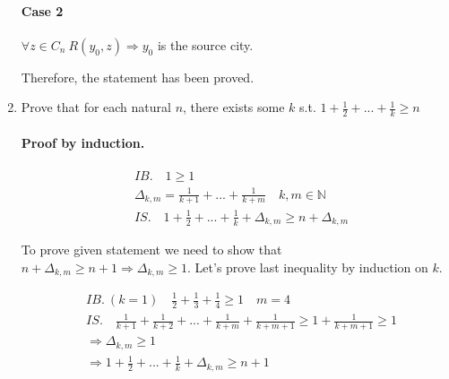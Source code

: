 \documentclass{article}
\begin{document}
\begin{enumerate}
\paragraph{Case 2}
$\forall z \in C_n \: R(y_0, z) \Rightarrow y_0 $ is the source city.

Therefore, the statement has been proved.

\item Prove that for each natural $n$, there exists some $k$ s.t. $1 + \frac{1}{2} + ... + \frac{1}{k} \geq n$

\paragraph{Proof by induction.}
\begin{align*}
&IB. \quad 1 \geq 1\\
&\Delta_{k,m} = \frac{1}{k+1} + ... + \frac{1}{k+m} \quad k, m \in \mathbb{N}\\
&IS. \quad 1 + \frac{1}{2} + ... + \frac{1}{k} + \Delta_{k,m} \geq n + \Delta_{k,m}
\end{align*}

To prove given statement we need to show that $n + \Delta_{k,m} \geq n + 1 \Rightarrow \Delta_{k,m} \geq 1$. Let's prove last inequality by induction on $k$.

\begin{align*}
&IB.\:(k=1) \quad \frac{1}{2} + \frac{1}{3} + \frac{1}{4} \geq 1 \quad m = 4\\
&IS. \quad \frac{1}{k+1} + \frac{1}{k+2} + ... + \frac{1}{k+m} + \frac{1}{k+m+1} \geq 1 + \frac{1}{k+m+1} \geq 1\\
&\Rightarrow \Delta_{k,m} \geq 1\\
&\Rightarrow 1 + \frac{1}{2} + ... + \frac{1}{k} + \Delta_{k,m} \geq n + 1
\end{align*}


\end{enumerate}
\end{document}
